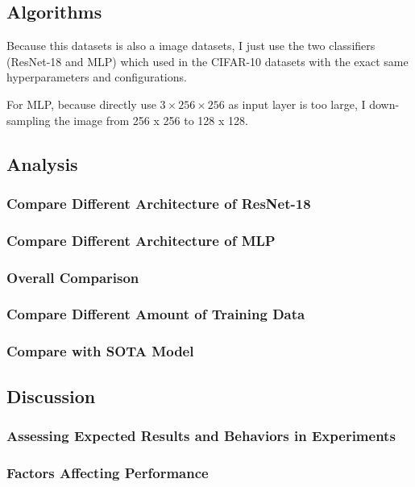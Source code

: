 \documentclass[twocolumn, draft]{extarticle}
\begin{document}
\subsection{Algorithms}

Because this datasets is also a image datasets, I just use the two classifiers (ResNet-18 and MLP) which used in the CIFAR-10 datasets with the exact same hyperparameters and configurations.

For MLP, because directly use $3 \times 256 \times 256$ as input layer is too large, I down-sampling the image from 256 x 256 to 128 x 128.

\subsection{Analysis}
\subsubsection{Compare Different Architecture of ResNet-18}
\subsubsection{Compare Different Architecture of MLP}
\subsubsection{Overall Comparison}

\subsubsection{Compare Different Amount of Training Data}

\subsubsection{Compare with SOTA Model}

\subsection{Discussion}
\subsubsection{Assessing Expected Results and Behaviors in Experiments}
\subsubsection{Factors Affecting Performance}
\end{document}
